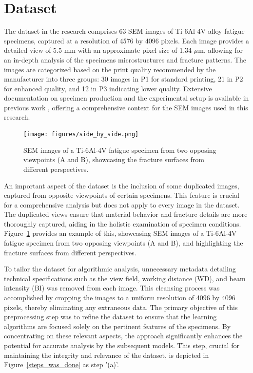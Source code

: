 \documentclass[preprint,12pt]{elsarticle}
\begin{document}
\section{Dataset} \label{Sec:dataset}

The dataset in the research comprises 63 SEM images of Ti-6Al-4V alloy fatigue specimens, captured at a resolution of 4576 by 4096 pixels. Each image provides a detailed view of 5.5 mm with an approximate pixel size of 1.34 $\mu$m, allowing for an in-depth analysis of the specimens microstructures and fracture patterns. The images are categorized based on the print quality recommended by the manufacturer into three groups: 30 images in P1 for standard printing, 21 in P2 for enhanced quality, and 12 in P3 indicating lower quality. Extensive documentation on specimen production and the experimental setup is available in previous work \cite{navickaite2022efficient}, offering a comprehensive context for the SEM images used in this research.

\begin{figure}[h!]
  \centering
  \texttt{[image: figures/side\_by\_side.png]}
  \caption{SEM images of a Ti-6Al-4V fatigue specimen from two opposing viewpoints (A and B), showcasing the fracture surfaces from different perspectives.}
  \label{same_material_from_both_sides}
\end{figure}

An important aspect of the dataset is the inclusion of some duplicated images, captured from opposite viewpoints of certain specimens. This feature is crucial for a comprehensive analysis but does not apply to every image in the dataset. The duplicated views ensure that material behavior and fracture details are more thoroughly captured, aiding in the holistic examination of specimen conditions. Figure~\ref{same_material_from_both_sides} provides an example of this, showcasing SEM images of a Ti-6Al-4V fatigue specimen from two opposing viewpoints (A and B), and highlighting the fracture surfaces from different perspectives.





\vspace{\baselineskip}
To tailor the dataset for algorithmic analysis, unnecessary metadata detailing technical specifications such as the view field, working distance (WD), and beam intensity (BI) was removed from each image. This cleansing process was accomplished by cropping the images to a uniform resolution of 4096 by 4096 pixels, thereby eliminating any extraneous data. The primary objective of this preprocessing step was to refine the dataset to ensure that the learning algorithms are focused solely on the pertinent features of the specimens. By concentrating on these relevant aspects, the approach significantly enhances the potential for accurate analysis by the subsequent models. This step, crucial for maintaining the integrity and relevance of the dataset, is depicted in Figure~\ref{steps_was_done} as step '(a)'.
\end{document}
